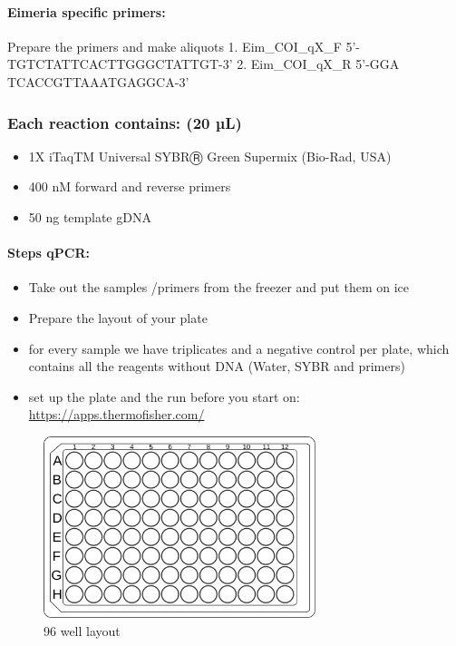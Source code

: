 \documentclass[
]{article}
\providecommand{\tightlist}{%
  \setlength{\itemsep}{0pt}\setlength{\parskip}{0pt}}
\begin{document}
\hypertarget{eimeria-specific-primers}{%
\paragraph{Eimeria specific primers:}\label{eimeria-specific-primers}}

Prepare the primers and make aliquots 1. Eim\_COI\_qX\_F
5'-TGTCTATTCACTTGGGCTATTGT-3' 2. Eim\_COI\_qX\_R 5'-GGA
TCACCGTTAAATGAGGCA-3'

\hypertarget{each-reaction-contains-20-uxb5l}{%
\subsubsection{Each reaction contains: (20
µL)}\label{each-reaction-contains-20-uxb5l}}

\begin{itemize}
\tightlist
\item
  1X iTaqTM Universal SYBRⓇ Green Supermix (Bio-Rad, USA)
\item
  400 nM forward and reverse primers
\item
  50 ng template gDNA
\end{itemize}

\hypertarget{steps-qpcr}{%
\paragraph{Steps qPCR:}\label{steps-qpcr}}

\begin{itemize}
\tightlist
\item
  Take out the samples /primers from the freezer and put them on ice
\item
  Prepare the layout of your plate
\item
  for every sample we have triplicates and a negative control per plate,
  which contains all the reagents without DNA (Water, SYBR and primers)
\item
  set up the plate and the run before you start on:
  \url{https://apps.thermofisher.com/}
\end{itemize}

\begin{figure}
\centering
\includegraphics[width=3.125in,height=2.08333in]{96-Well_plate.png}
\caption{96 well layout}
\end{figure}
\end{document}
